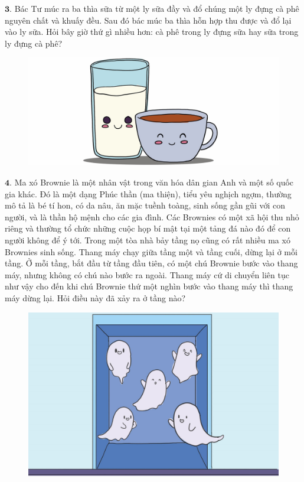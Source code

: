 \begin{multicols}{2}
\begin{figure}[H]
		\vspace*{-15pt}
	\end{figure}
	$\pmb{3.}$ 	Bác Tư múc ra ba thìa sữa từ một ly sữa đầy và đổ chúng một ly đựng cà phê nguyên chất và khuấy đều. Sau đó bác múc ba thìa hỗn hợp thu được và đổ lại vào ly sữa. Hỏi bây giờ thứ gì nhiều hơn: cà phê trong ly đựng sữa hay sữa trong ly đựng cà phê?
	\begin{figure}[H]
		\centering
		\vspace*{5pt}
		\captionsetup{labelformat= empty, justification=centering}
		\includegraphics[width=1\linewidth]{Pi4_bai3}
		\vspace*{-15pt}
	\end{figure}
	$\pmb{4.}$ Ma xó Brownie là một nhân vật trong văn hóa dân gian Anh và một số quốc gia khác. Đó là một dạng Phúc thần (ma thiện), tiểu yêu nghịch ngợm, thường mô tả là bé tí hon, có da nâu, ăn mặc tuềnh toàng, sinh sống gần gũi với con người, và là thần hộ mệnh cho các gia đình. Các Brownies có một xã hội thu nhỏ riêng và thường tổ chức những cuộc họp bí mật tại một tảng đá nào đó để con người không để ý tới. 
	\vskip 0.1cm
	Trong một tòa nhà bảy tầng nọ cũng có rất nhiều ma xó Brownies sinh sống. Thang máy chạy giữa tầng một và tầng cuối, dừng lại ở mỗi tầng. Ở mỗi tầng, bắt đầu từ tầng đầu tiên, có một chú Brownie bước vào thang máy, nhưng không có chú nào bước ra ngoài. Thang máy cứ di chuyển liên tục như vậy cho đến khi chú Brownie thứ một nghìn bước vào thang máy thì thang máy dừng lại. Hỏi điều này đã xảy ra ở tầng nào?
	\begin{figure}[H]
		\centering
		\vspace*{-5pt}
		\captionsetup{labelformat= empty, justification=centering}
		\includegraphics[width=1\linewidth]{Pi4_bai4}

\end{figure}
\end{multicols}
